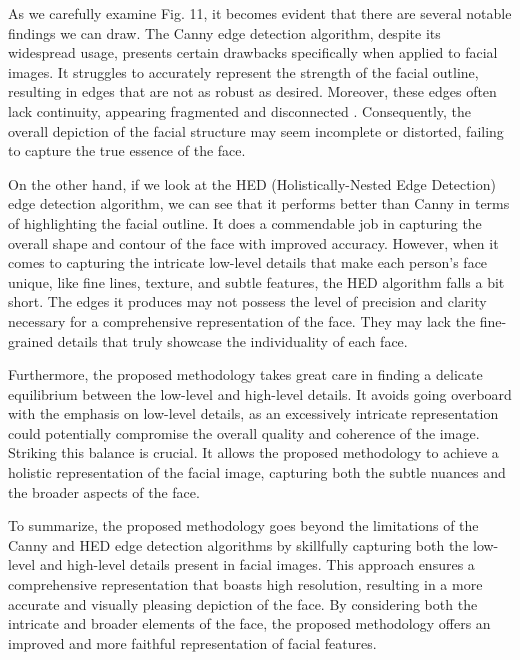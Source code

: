 \documentclass{70_styles/svproc}
\begin{document}
As we carefully examine Fig. 11, it becomes evident that there are several notable findings we can draw. The Canny edge detection algorithm, despite its widespread usage, presents certain drawbacks specifically when applied to facial images. It struggles to accurately represent the strength of the facial outline, resulting in edges that are not as robust as desired. Moreover, these edges often lack continuity, appearing fragmented and disconnected \cite{1990ph...book.....L}. Consequently, the overall depiction of the facial structure may seem incomplete or distorted, failing to capture the true essence of the face.

On the other hand, if we look at the HED (Holistically-Nested Edge Detection) edge detection algorithm, we can see that it performs better than Canny in terms of highlighting the facial outline. It does a commendable job in capturing the overall shape and contour of the face with improved accuracy. However, when it comes to capturing the intricate low-level details that make each person's face unique, like fine lines, texture, and subtle features, the HED algorithm falls a bit short. The edges it produces may not possess the level of precision and clarity necessary for a comprehensive representation of the face. They may lack the fine-grained details that truly showcase the individuality of each face.

Furthermore, the proposed methodology takes great care in finding a delicate equilibrium between the low-level and high-level details. It avoids going overboard with the emphasis on low-level details, as an excessively intricate representation could potentially compromise the overall quality and coherence of the image. Striking this balance is crucial. It allows the proposed methodology to achieve a holistic representation of the facial image, capturing both the subtle nuances and the broader aspects of the face.

To summarize, the proposed methodology goes beyond the limitations of the Canny and HED edge detection algorithms by skillfully capturing both the low-level and high-level details present in facial images. This approach ensures a comprehensive representation that boasts high resolution, resulting in a more accurate and visually pleasing depiction of the face. By considering both the intricate and broader elements of the face, the proposed methodology offers an improved and more faithful representation of facial features.
\end{document}
